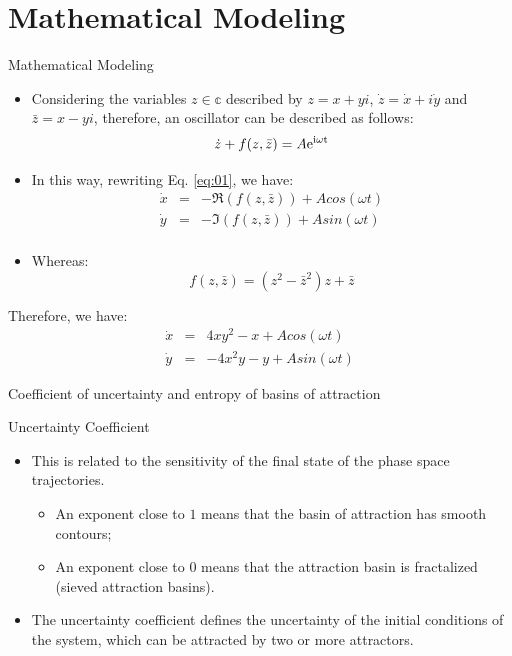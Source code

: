 \documentclass[
	10pt,aspectratio=169 %
]{beamer}
\begin{document}
\section{Mathematical Modeling}
\begin{frame}{Mathematical Modeling}
    \transwipe
    \begin{itemize}
        \item Considering the variables $z \in \mathbb{c}$ described by $z=x+yi$, $\dot{z}=\dot{x}+i\dot{y}$ and $\bar{z}=x-yi$, therefore, an oscillator can be described as follows:
        \begin{equation}
        \dot{z}+f(z,\bar{z})=A\rm{e}^{i \omega t}
        \label{eq:01}
        \end{equation}
\item In this way, rewriting Eq. \ref{eq:01}, we have:
\begin{eqnarray}
\dot{x} &=& -\Re(f(z,\bar{z}))+Acos(\omega t) \\ \nonumber
\dot{y} &=& -\Im(f(z,\bar{z}))+Asin(\omega t) \\ \nonumber
\end{eqnarray}
\item Whereas:
\begin{equation}
    f(z,\bar{z})=(z^2-\bar{z}^2)z+\bar{z}
\end{equation}
\end{itemize}
Therefore, we have:
\begin{eqnarray}
    \dot{x} &=& 4xy^2 -x+ A cos(\omega t) \\ \nonumber
    \dot{y} &=& -4x^2y -y+ A sin(\omega t)
\end{eqnarray}
\end{frame}

\begin{frame}{Coefficient of uncertainty and entropy of basins of attraction}
    \transwipe
    \begin{block}{Uncertainty Coefficient}
    \begin{itemize}
    \item This is related to the sensitivity of the final state of the phase space trajectories.
    \begin{itemize}
    \item An exponent close to $1$ means that the basin of attraction has smooth contours;
     \item An exponent close to $0$ means that the attraction basin is fractalized (sieved attraction basins).
    \end{itemize}
    \item The uncertainty coefficient defines the uncertainty of the initial conditions of the system, which can be attracted by two or more attractors.
    \end{itemize}
    \end{block}
\end{frame}
\end{document}

